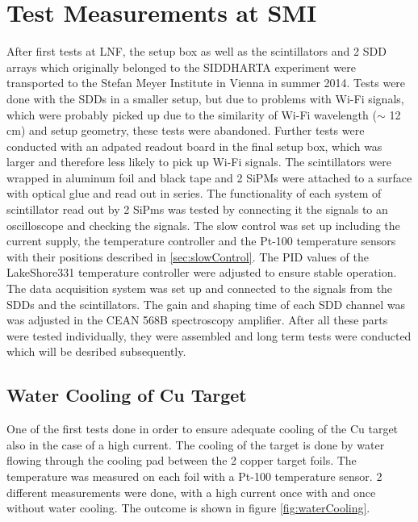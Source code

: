 \section{Test Measurements at SMI}

After first tests at LNF, the setup box as well as the scintillators and 2 SDD arrays which originally belonged to the SIDDHARTA experiment were transported to the Stefan Meyer Institute in Vienna in summer 2014. Tests were done with the SDDs in a smaller setup, but due to problems with Wi-Fi signals, which were probably picked up due to the similarity of Wi-Fi wavelength ($\sim$ 12 cm) and setup geometry, these tests were abandoned. Further tests were conducted with an adpated readout board in the final setup box, which was larger and therefore less likely to pick up Wi-Fi signals. The scintillators were wrapped in aluminum foil and black tape and 2 SiPMs were attached to a surface with optical glue and read out in series. The functionality of each system of scintillator read out by 2 SiPms was tested by connecting it the signals to an oscilloscope and checking the signals. The slow control was set up including the current supply, the temperature controller and the Pt-100 temperature sensors with their positions described in \ref{sec:slowControl}. The PID values of the LakeShore331 temperature controller were adjusted to ensure stable operation. The data acquisition system was set up and connected to the signals from the SDDs and the scintillators. The gain and shaping time of each SDD channel was was adjusted in the CEAN 568B spectroscopy amplifier. After all these parts were tested individually, they were assembled and long term tests were conducted which will be desribed subsequently.

\subsection{Water Cooling of Cu Target}

One of the first tests done in order to ensure adequate cooling of the Cu target also in the case of a high current. The cooling of the target is done by water flowing through the cooling pad between the 2 copper target foils. The temperature was measured on each foil with a Pt-100 temperature sensor. 2 different measurements were done, with a high current once with and once without water cooling. The outcome is shown in figure \ref{fig:waterCooling}.

